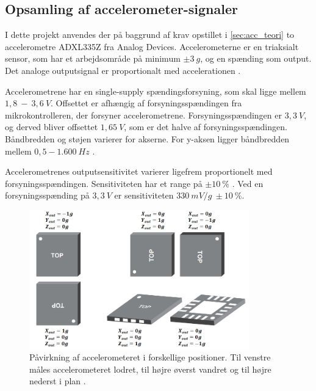 \subsection{Opsamling af accelerometer-signaler}\label{sec:acc_imp}

I dette projekt anvendes der på baggrund af krav opstillet i \autoref{sec:acc_teori} to accelerometre ADXL335Z fra Analog Devices. Accelerometerne er en triaksialt sensor, som har et arbejdsområde på minimum $\pm3~g$, og en spænding som output. Det analoge outputsignal er proportionalt med accelerationen \citep{analogdevices2009}. 

Accelerometrene har en single-supply spændingsforsyning, som skal ligge mellem $1,8~-~3,6~V$.  Offsettet er afhængig af forsyningsspændingen fra mikrokontrolleren, der forsyner accelerometrene. Forsyningsspændingen er $3,3~V$, og derved bliver offsettet $1,65~V$, som er det halve af forsyningsspændingen. Båndbredden og støjen varierer for akserne. For y-aksen ligger båndbredden mellem $0,5 - 1.600~Hz$  \citep{analogdevices2010}.

Accelerometrenes outputsensitivitet varierer ligefrem proportionelt med forsyningsspændingen. Sensitiviteten har et range på $\pm10~\%$ \citep{analogdevices2010}. Ved en forsyningsspænding på $3,3~V$ er sensitiviteten $330~mV/g~\pm 10~\%$. 

\begin{figure}[H]
\centering
\includegraphics[width=0.85\textwidth]{figures/acc_paavirkning}
\caption{Påvirkning af accelerometeret i forskellige positioner. Til venstre måles accelerometeret lodret, til højre øverst vandret og til højre nederst i plan \citep{analogdevices2010}.}
\label{fig:acc}
\end{figure}

